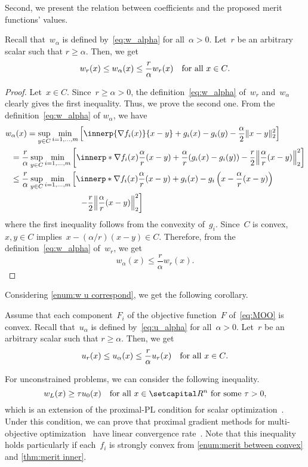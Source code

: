 \documentclass[../main]{subfiles}
\begin{document}
Second, we present the relation between coefficients and the proposed merit functions' values.
\begin{theorem} \label{thm:merit inner}
    Recall that~$w_\alpha$ is defined by~\cref{eq:w_alpha} for all~$\alpha > 0$.
    Let~$r$ be an arbitrary scalar such that $r \ge \alpha$.
    Then, we get
    \[
        w_r(x) \le w_\alpha(x) \le \frac{r}{\alpha} w_r(x) \quad \text{for all~$x \in C$}
    .\]
\end{theorem}
\begin{proof}
    Let~$x \in C$.
    Since~$r \ge \alpha > 0$, the definition~\cref{eq:w_alpha} of~$w_r$ and~$w_\alpha$ clearly gives the first inequality.
    Thus, we prove the second one.
    From the definition~\cref{eq:w_alpha} of $w_\alpha$, we have
\begin{align}
    \MoveEqLeft w_\alpha(x) = \sup_{y \in C} \min_{i = 1, \dots, m} \left[ \innerp{\nabla f_i(x)}{x - y} + g_i(x) - g_i(y) - \frac{\alpha}{2}\norm{x - y}_2^2 \right] \\
    ={}& \frac{r}{\alpha} \sup_{y \in C} \min_{i = 1, \dots, m} \left[ \innerp*{\nabla f_i(x)}{ \frac{\alpha}{r}(x - y) } + \frac{\alpha}{r}(g_i(x) - g_i(y)) - \frac{r}{2} \norm*{ \frac{\alpha}{r} (x - y) }_2^2 \right] \\
    \le{}& \frac{r}{\alpha} \sup_{y \in C} \min_{i = 1, \dots, m} \left[ \innerp*{\nabla f_i(x)}{ \frac{\alpha}{r} (x - y) } + g_i(x) - g_i \left(x - \frac{\alpha}{r}(x - y)\right) \right. \\
        &\hspace{7em} \left. - \frac{r}{2}\norm*{\frac{\alpha}{r}(x - y)}_2^2 \right]
\end{align}
where the first inequality follows from the convexity of~$g_i$.
Since~$C$ is convex, $x, y \in C$ implies~$x - (\alpha / r)(x - y) \in C$.
Therefore, from the definition~\cref{eq:w_alpha} of~$w_r$, we get
\[
    w_\alpha(x) \le \frac{r}{\alpha} w_r(x)
.\] 
\end{proof}

Considering \cref{enum:w u correspond}, we get the following corollary.
\begin{corollary}
    Assume that each component~$F_i$ of the objective function~$F$ of~\cref{eq:MOO} is convex.
    Recall that~$u_\alpha$ is defined by~\cref{eq:u_alpha} for all~$\alpha > 0$.
    Let~$r$ be an arbitrary scalar such that $r \ge \alpha$.
    Then, we get
    \[
        u_r(x) \le u_\alpha(x) \le \frac{r}{\alpha} u_r(x) \quad \text{for all~$x \in C$}
    .\]
\end{corollary}

\begin{remark}
    For unconstrained problems, we can consider the following inequality.
    \[ \label{eq:MOO proximal-PL}
        w_L(x) \ge \tau u_0(x) \condition{for all~$x \in \setR^n$ for some~$\tau > 0$}
    ,\]
    which is an extension of the proximal-PL condition for scalar optimization~\cite{Karimi2016}.
    Under this condition, we can prove that proximal gradient methods for multi-objective optimization~\cite{Tanabe2019} have linear convergence rate~\cite{Tanabe2022}.
    Note that this inequality holds particularly if each~$f_i$ is strongly convex from \cref{enum:merit between convex} and \cref{thm:merit inner}.
\end{remark}
\end{document}
